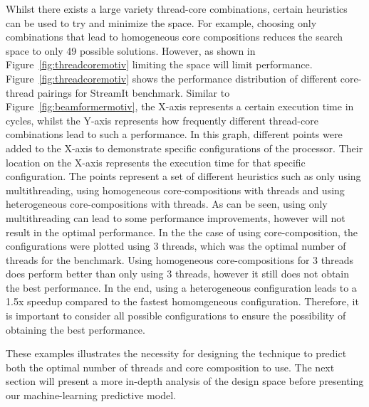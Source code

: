 Whilst there exists a large variety thread-core combinations, certain heuristics can be used to try and minimize the space.
For example, choosing only combinations that lead to homogeneous core compositions reduces the search space to only 49 possible solutions.
However, as shown in Figure~\ref{fig:threadcoremotiv} limiting the space will limit performance.
Figure~\ref{fig:threadcoremotiv} shows the performance distribution of different core-thread pairings for  StreamIt benchmark.
Similar to Figure~\ref{fig:beamformermotiv}, the X-axis represents a certain execution time in cycles, whilst the Y-axis represents how frequently different thread-core combinations lead to such a performance.
In this graph, different points were added to the X-axis to demonstrate specific configurations of the processor.
Their location on the X-axis represents the execution time for that specific configuration.
The points represent a set of different heuristics such as only using multithreading, using homogeneous core-compositions with threads and using heterogeneous core-compositions with threads.
As can be seen, using only multithreading can lead to some performance improvements, however will not result in the optimal performance.
In the the case of using core-composition, the configurations were plotted using 3 threads, which was the optimal number of threads for the benchmark.
Using homogeneous core-compositions for 3 threads does perform better than only using 3 threads, however it still does not obtain the best performance.
In the end, using a heterogeneous configuration leads to a 1.5x speedup compared to the fastest homomgeneous configuration.
Therefore, it is important to consider all possible configurations to ensure the possibility of obtaining the best performance.

These examples illustrates the necessity for designing the technique to predict both the optimal number of threads and core composition to use.
The next section will present a more in-depth analysis of the design space before presenting our machine-learning predictive model.

